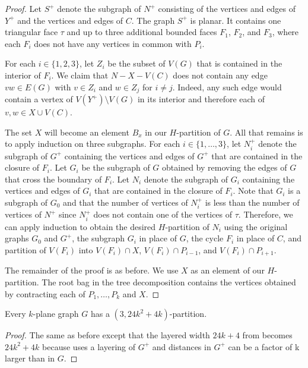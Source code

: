 \documentclass{patmorin}
\begin{document}
\begin{proof}
  Let $S^+$ denote the subgraph of $N^+$ consisting of the vertices and edges of $Y^+$ and the vertices and edges of $C$.  The graph $S^+$ is planar. It contains one triangular face $\tau$ and up to three additional bounded faces $F_1$, $F_2$, and $F_3$, where each $F_i$ does not have any vertices in common with $P_i$.
  
  For each $i\in\{1,2,3\}$, let $Z_i$ be the subset of $V(G)$ that is contained in the interior of $F_i$.  We claim that $N-X-V(C)$ does not contain any edge $vw\in E(G)$ with $v\in Z_i$ and $w\in Z_j$ for $i\neq j$.  Indeed, any such edge would contain a vertex of $V(Y^+)\setminus V(G)$ in its interior and therefore each of $v,w\in X\cup V(C)$.

  The set $X$ will become an element $B_x$ in our $H$-partition of $G$.  All that remains is to apply induction on three subgraphs.  For each $i\in\{1,\ldots,3\}$, let $N_i^+$ denote the subgraph of $G^+$ containing the vertices and edges of $G^+$ that are contained in the closure of $F_i$.  
  Let $G_i$ be the subgraph of $G$ obtained by removing the edges of $G$ that cross the boundary of $F_i$.
  Let $N_i$ denote the subgraph of $G_i$ containing the vertices and edges of $G_i$ that are contained in the closure of $F_i$.  Note that $G_i$ is a subgraph of $G_0$ and that the number of vertices of $N_i^+$ is less than the number of vertices of $N^+$ since $N_i^+$ does not contain one of the vertices of $\tau$.  Therefore, we can apply induction to obtain the desired $H$-partition of $N_i$ using the original graphs $G_0$ and $G^+$, the subgraph $G_i$ in place of $G$, the cycle $F_i$ in place of $C$, and partition of $V(F_i)$ into $V(F_i)\cap X$, $V(F_i)\cap P_{i-1}$, and $V(F_i)\cap P_{i+1}$.
  
  The remainder of the proof is as before. We use $X$ as an element of our $H$-partition. The root bag in the tree decomposition contains the vertices obtained by contracting each of $P_1,\ldots,P_k$ and $X$.
\end{proof}


\begin{thm}
  Every $k$-plane graph $G$ has a $(3, 24k^2+4k)$-partition.
\end{thm}

\begin{proof}
  The same as before except that the layered width $24k+4$ from  becomes $24k^2+4k$ because  uses a layering of $G^+$ and distances in $G^+$ can be a factor of k larger than in $G$.
\end{proof}
\end{document}
